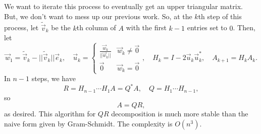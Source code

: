         We want to iterate this process to eventually get an upper triangular matrix. But, we don't want to mess up our previous work. So, at the \(k\)th step of this process, let \(\tilde{\vec{v}}_k\) be the \(k\)th column of \(A\) with the first \(k-1\) entries set to \(0\). Then, let
        \begin{equation*}
            \vec{w}_1=\tilde{\vec{v}}_k-||\tilde{\vec{v}}_k||\vec{e}_k,\quad \vec{u}_k=\begin{cases} \frac{\vec{w}_k}{||\vec{w}_k||} & \vec{w}_k\neq\vec{0} \\ \vec{0} & \vec{w}_k=\vec{0} \end{cases}, \quad H_k=I-2\vec{u}_k\vec{u}_k^*,\quad A_{k+1}=H_kA_k.
        \end{equation*}
        In \(n-1\) steps, we have 
        \begin{equation*}
            R=H_{n-1}\cdots H_1A=Q^*A,\quad Q=H_1\cdots H_{n-1},
        \end{equation*}
        so
        \begin{equation*}
            A=QR,
        \end{equation*}
        as desired. This algorithm for \(QR\) decomposition is much more stable than the naive form given by Gram-Schmidt. The complexity is \(O(n^3)\).
